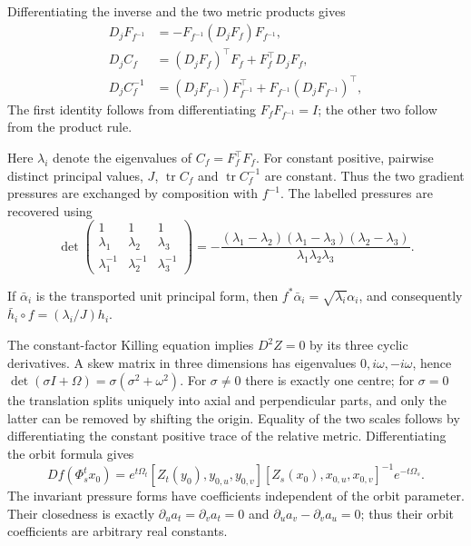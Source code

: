 \documentclass[11pt,a4paper]{article}
\numberwithin{equation}{section}
\theoremstyle{plain}
\theoremstyle{definition}
\theoremstyle{remark}
\begin{document}
Differentiating the inverse and the two metric products gives
\[
\begin{aligned}
D_jF_{f^{-1}}&=-F_{f^{-1}}(D_jF_f)F_{f^{-1}},\\
 D_j C_f&=(D_jF_f)^{\top}F_f+F_f^{\top}D_jF_f,\\
 D_j C_f^{-1}&=(D_jF_{f^{-1}})F_{f^{-1}}^{\top}+F_{f^{-1}}(D_jF_{f^{-1}})^{\top},
\end{aligned}
\]
The first identity follows from differentiating $F_fF_{f^{-1}}=I$; the other two follow from the product rule.

Here $\lambda_i$ denote the eigenvalues of $C_f=F_f^{\top}F_f$.
For constant positive, pairwise distinct principal values, $J$, $\operatorname{tr}C_f$ and
$\operatorname{tr}C_f^{-1}$ are constant. Thus the two gradient pressures are
exchanged by composition with $f^{-1}$. The labelled pressures are recovered
using
\begin{equation}\label{adil:vandermonde}
 \det\begin{pmatrix}
 1&1&1\\ \lambda_1&\lambda_2&\lambda_3\\
 \lambda_1^{-1}&\lambda_2^{-1}&\lambda_3^{-1}
 \end{pmatrix}
 =-\frac{(\lambda_1-\lambda_2)(\lambda_1-\lambda_3)
                 (\lambda_2-\lambda_3)}{\lambda_1\lambda_2\lambda_3}.
\end{equation}

If $\bar\alpha_i$ is the transported unit principal form, then
$f^*\bar\alpha_i=\sqrt{\lambda_i}\alpha_i$, and consequently
$\bar h_i\circ f=(\lambda_i/J)h_i$.

The constant-factor Killing equation implies $D^2Z=0$ by its three cyclic
derivatives. A skew matrix in three dimensions has eigenvalues
$0,i\omega,-i\omega$, hence
$\det(\sigma I+\Omega)=\sigma(\sigma^2+\omega^2)$.
For $\sigma\ne0$ there is exactly one centre; for $\sigma=0$ the
translation splits uniquely into axial and perpendicular parts, and only
the latter can be removed by shifting the origin. Equality of the two
scales follows by differentiating the constant positive trace of the
relative metric. Differentiating the orbit formula gives
\[
 Df(\Phi_s^t x_0)=e^{t\Omega_t}
 [Z_t(y_0),y_{0,u},y_{0,v}]
 [Z_s(x_0),x_{0,u},x_{0,v}]^{-1}e^{-t\Omega_s}.
\]
The invariant pressure forms have coefficients independent of the orbit
parameter. Their closedness is exactly
$\partial_ua_t=\partial_va_t=0$ and
$\partial_ua_v-\partial_va_u=0$; thus their orbit coefficients are arbitrary real constants.
\end{document}
